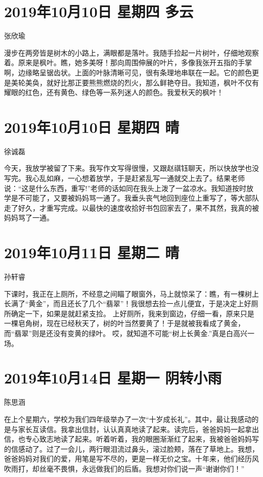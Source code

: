 \section{2019年10月10日 星期四 多云}

张欣瑜

漫步在两旁皆是树木的小路上，满眼都是落叶。我随手捡起一片树叶，仔细地观察着。原来是枫叶。瞧，她多美呀！那向周围伸展的叶片，多像我张开五指的手掌啊，边缘略呈锯齿状。上面的叶脉清晰可见，很有条理地串联在一起。它的颜色更是美轮美奂，就好比那正要熊熊燃烧的烈火，那么鲜艳夺目。我知道，枫叶不仅有耀眼的红色，还有黄色、绿色等一系列迷人的颜色。我爱秋天的枫叶！

\section{2019年10月10日 星期四 晴}

徐诚磊

今天，我放学被留了下来。我写作文写得很慢，又跟赵祺钰聊天，所以快放学也没写完。我心乱如麻，一心想着放学，于是赶紧乱写一通就交上去了。结果老师说：“这是什么东西，重写!”老师的话如同在我头上泼了一盆凉水。我知道按时放学是不可能了，又要被妈妈骂一通了。我垂头丧气地回到座位上重写了，等大部队走了好久，才重写完成。以最快的速度收拾好书包回家去了，果不其然，我真的被妈妈骂了一通。

\section{2019年10月11日 星期二 晴}

孙轩睿

下课时，我正在上厕所，不经意之间瞄了眼窗外，马上就惊呆了：瞧，有一棵树上长满了“黄金”，而且还长了几个“翡翠”！我很想去捡一点儿便宜，于是决定上好厕所确定一下，如果是就赶紧支捡。
上好厕所，我来到窗边，仔细一看，原来只是一棵皂角树，现在已经秋天了，树的叶当然要黄了！于是就被我看成了黄金，而“翡翠”则是还没有变黄的绿叶。
哎，就知道不可能“树上长黄金.”真是白高兴一场。

\section{2019年10月14日 星期一 阴转小雨}

陈思涵

在上个星期六，学校为我们四年级举办了一次“十岁成长礼”。其中，最让我感动的是与家长互读信。我拿出信封，认认真真地读了起来。读完后，爸爸妈妈一起拿出信，也专心致志地读了起来。听着听着，我的眼圈渐渐红了起来，我被爸爸妈妈写的信感动了。过了一会儿，两行眼泪流过鼻头，滚过脸颊，落在了草地上。我想，爸爸妈妈对我们的爱，用笔是写不尽的，更是一样无价之宝。十年来，他们经历风吹雨打，却丝毫不畏惧，永远做我们的后盾。我想对你们说一声“谢谢你们！”

